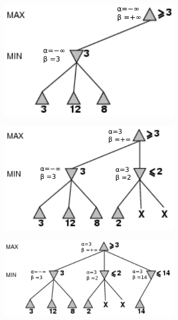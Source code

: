\begin{figure}[H]
    \begin{subfigure}{.3\textwidth}
        \centering
        \includegraphics[width=\linewidth]{img/alphabeta_algo_example1.png}
    \end{subfigure}
    \begin{subfigure}{.3\textwidth}
        \centering
        \includegraphics[width=\linewidth]{img/alphabeta_algo_example2.png}
    \end{subfigure}
    \begin{subfigure}{.4\textwidth}
        \centering
        \includegraphics[width=\linewidth]{img/alphabeta_algo_example3.png}

\end{subfigure}
\end{figure}
